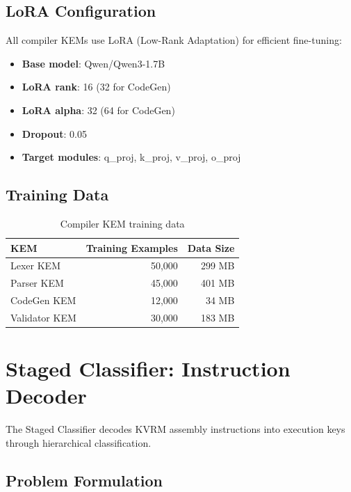 \documentclass[11pt]{article}
\begin{document}
\subsection{LoRA Configuration}

All compiler KEMs use LoRA (Low-Rank Adaptation) for efficient fine-tuning:

\begin{itemize}
    \item \textbf{Base model}: Qwen/Qwen3-1.7B
    \item \textbf{LoRA rank}: 16 (32 for CodeGen)
    \item \textbf{LoRA alpha}: 32 (64 for CodeGen)
    \item \textbf{Dropout}: 0.05
    \item \textbf{Target modules}: q\_proj, k\_proj, v\_proj, o\_proj
\end{itemize}

\subsection{Training Data}

\begin{table}[h]
\centering
\begin{tabular}{lrr}
\toprule
\textbf{KEM} & \textbf{Training Examples} & \textbf{Data Size} \\
\midrule
Lexer KEM & 50,000 & 299 MB \\
Parser KEM & 45,000 & 401 MB \\
CodeGen KEM & 12,000 & 34 MB \\
Validator KEM & 30,000 & 183 MB \\
\bottomrule
\end{tabular}
\caption{Compiler KEM training data}
\end{table}

\section{Staged Classifier: Instruction Decoder}

The Staged Classifier decodes KVRM assembly instructions into execution keys through hierarchical classification.

\subsection{Problem Formulation}
\end{document}

